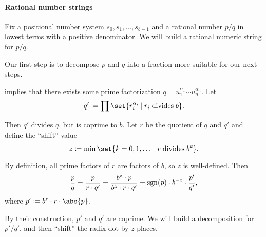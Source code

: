 \paragraph{Rational number strings}

\begin{algorithm}\label{alg:rational_number_to_positional_string}
  Fix a \hyperref[def:positional_number_system]{positional number system} \( s_0, s_1, \ldots, s_{b-1} \) and a rational number \( p / q \) \hyperref[def:lowest_terms]{in lowest terms} with a positive denominator. We will build a rational numeric string for \( p / q \).

  \begin{thmenum}
     Our first step is to decompose \( p \) and \( q \) into a fraction more suitable for our next steps.

     implies that there exists some prime factorization \( q = u_1^{\alpha_1} \cdots u_n^{\alpha_n} \). Let
    \begin{equation}\label{eq:thm:fundamental_theorem_of_arithmetic/decomposition/q_}
      q' \coloneqq \prod \set{ r_i^{\alpha_i} \given r_i \T{divides} b }.
    \end{equation}

    Then \( q' \) divides \( q \), but is coprime to \( b \). Let \( r \) be the quotient of \( q \) and \( q' \) and define the \enquote{shift} value
    \begin{equation}\label{eq:alg:rational_number_to_positional_string/decomposition/shift}
      z \coloneqq \min\set{ k = 0, 1, \ldots \given r \T{divides} b^k }.
    \end{equation}

    By definition, all prime factors of \( r \) are factors of \( b \), so \( z \) is well-defined. Then
    \begin{equation}\label{eq:alg:rational_number_to_positional_string/decomposition/pq}
      \frac p q
      =
      \frac p {r \cdot q'}
      =
      \frac {b^z \cdot p} {b^z \cdot r \cdot q'}
      =
      \operatorname{sgn}(p) \cdot b^{-z} \cdot \frac {p'} {q'},
    \end{equation}
    where \( p' \coloneqq b^z \cdot r \cdot \abs{p} \).

    By their construction, \( p' \) and \( q' \) are coprime. We will build a decomposition for \( p' / q' \), and then \enquote{shift} the radix dot by \( z \) places.


\end{thmenum}
\end{algorithm}
